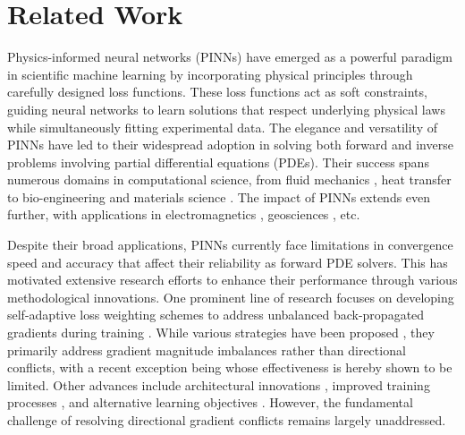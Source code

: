 \section{Related Work}
\label{sec: related_work}

Physics-informed neural networks (PINNs) have emerged as a powerful paradigm in scientific machine learning by incorporating physical principles through carefully designed loss functions. These loss functions act as soft constraints, guiding neural networks to learn solutions that respect underlying physical laws while simultaneously fitting experimental data. The elegance and versatility of PINNs have led to their widespread adoption in solving both forward and inverse problems involving partial differential equations (PDEs). Their success spans numerous domains in computational science, from fluid mechanics \cite{raissi2020hidden,almajid2022prediction,eivazi2022physics,cao2024surrogate}, heat transfer \cite{xu2023physics,bararnia2022application,gokhale2022physics} to bio-engineering \cite{kissas2020machine,zhang2023physics,caforio2024physics} and materials science \cite{zhang2022analyses,jeong2023physics, hu2024physics}. The impact of PINNs extends even further, with applications in electromagnetics \cite{kovacs2022conditional,khan2022physics,baldan2023physics}, geosciences \cite{smith2022hyposvi, song2023simulating,ren2024seismicnet}, etc.


Despite their broad applications, PINNs currently face limitations in convergence speed and accuracy that affect their reliability as forward PDE solvers. This has motivated extensive research efforts to enhance their performance through various methodological innovations.  One prominent line of research focuses on developing self-adaptive loss weighting schemes to address unbalanced back-propagated gradients during training \cite{wang2021understanding,wang2022and}. While various strategies have been proposed \cite{wang2023expert,wang2021understanding,wang2022and,li2022revisiting,chen2024self,anagnostopoulos2024residual,liu2024discontinuity,song2025vw}, they primarily address gradient magnitude imbalances rather than directional conflicts, with a recent exception being \cite{liu2024config} whose effectiveness is hereby shown to be limited. Other advances include architectural innovations \cite{wang2021understanding,sitzmann2020implicit,fathony2021multiplicative,moseley2021finite,kang2022pixel,cho2024separable,wang2024piratenets}, improved training processes \cite{nabian2021efficient,daw2022rethinking,wu2023comprehensive,muller2023achieving,jnini2024gauss,song2024admm,urban2025unveiling,wight2020solving,krishnapriyan2021characterizing,cao2023tsonn}, and alternative learning objectives \cite{chiu2022can,huang2024efficient,kharazmi2021hp,patel2022thermodynamically,yu2022gradient,son2021sobolev}. However, the fundamental challenge of resolving directional gradient conflicts remains largely unaddressed.